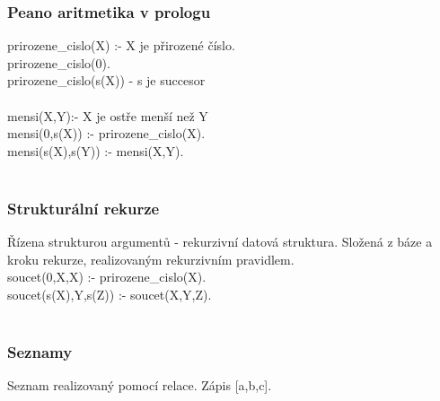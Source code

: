 \documentclass{article}
\begin{document}
\subsubsection*{Peano aritmetika v prologu}
prirozene\_cislo(X) :- X je přirozené číslo.\\
prirozene\_cislo(0). \\
prirozene\_cislo(s(X)) - s je succesor\\\\

mensi(X,Y):- X je ostře menší než Y\\
mensi(0,s(X)) :- prirozene\_cislo(X).\\
mensi(s(X),s(Y)) :- mensi(X,Y).\\\\

\subsubsection*{Strukturální rekurze}
Řízena strukturou argumentů - rekurzivní datová struktura. Složená z báze a kroku rekurze, realizovaným rekurzivním pravidlem.\\
soucet(0,X,X) :- prirozene\_cislo(X).\\
soucet(s(X),Y,s(Z)) :- soucet(X,Y,Z).\\\\

\subsubsection*{Seznamy}
Seznam realizovaný pomocí relace. Zápis [a,b,c].
\end{document}
